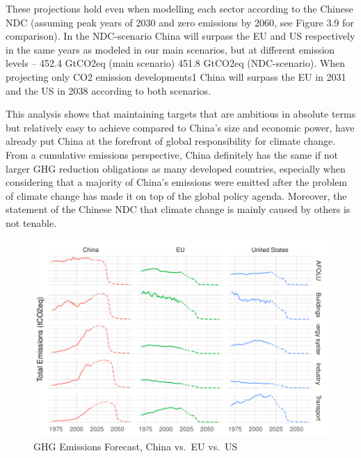 \documentclass[
  12pt,
]{article}
\numberwithin{equation}{section}
\numberwithin{table}{section}
\numberwithin{figure}{section}
\begin{document}
These projections hold even when modelling each sector according to the
Chinese NDC (assuming peak years of 2030 and zero emissions by 2060, see
Figure 3.9 for comparison). In the NDC-scenario China will surpass the
EU and US respectively in the same years as modeled in our main
scenarios, but at different emission levels -- 452.4 GtCO2eq (main
scenario) 451.8 GtCO2eq (NDC-scenario). When projecting only CO2
emission developments1 China will surpass the EU in 2031 and the US in
2038 according to both scenarios.

This analysis shows that maintaining targets that are ambitious in
absolute terms but relatively easy to achieve compared to China's size
and economic power, have already put China at the forefront of global
responsibility for climate change. From a cumulative emissions
perspective, China definitely has the same if not larger GHG reduction
obligations as many developed countries, especially when considering
that a majority of China's emissions were emitted after the problem of
climate change has made it on top of the global policy agenda. Moreover,
the statement of the Chinese NDC that climate change is mainly caused by
others is not tenable.

\begin{figure}
\centering
\includegraphics{Paper_files/figure-latex/unnamed-chunk-9-1.pdf}
\caption{GHG Emissions Forecast, China vs.~EU vs.~US}
\end{figure}
\end{document}
